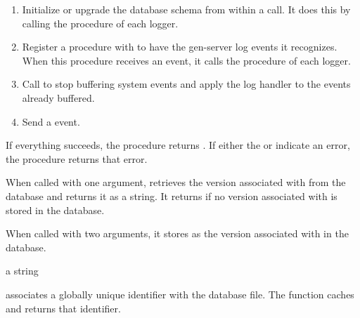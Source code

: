 \begin{enumerate}
  \item Initialize or upgrade the database schema from within a
     call. It does this by calling the
     procedure of each logger.
  \item Register a procedure with  to
    have the  gen-server log events it recognizes. When
    this procedure receives an event, it calls the 
    procedure of each logger.
  \item Call  to stop buffering system
    events and apply the log handler to the events already buffered.
  \item Send a  event.
\end{enumerate}

If everything succeeds, the procedure returns . If
either the  or
 indicate an error, the procedure
returns that error.

\begin{procedure}
\end{procedure}

\begin{argtbl}
\end{argtbl}

When called with one argument,  retrieves the
version associated with  from the database and returns it as
a string. It returns  if no version associated with
 is stored in the database.

When called with two arguments, it stores  as the version
associated with  in the database.

\begin{procedure}
\end{procedure}

\returns{} a string

 associates a globally unique identifier with the
database file. The  function caches and
returns that identifier.

\begin{property}
  \label{make-swish-event-logger}
\end{property}

